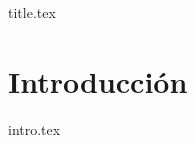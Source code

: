 \documentclass[letterpaper,11pt]{book}
\begin{document}


\frontmatter
{title.tex}

\clearpage
\thispagestyle{empty}

\tableofcontents

\mainmatter
\chapter{Introducción}
{intro.tex}
\end{document}
